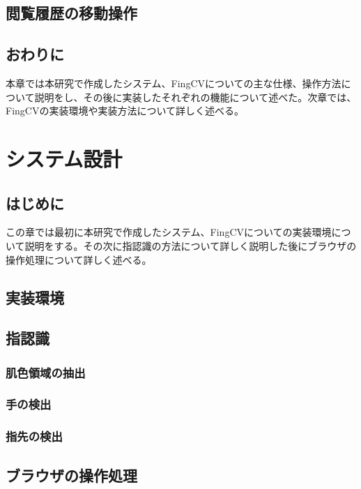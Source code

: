\documentclass[11pt,a4j, titlepage]{jarticle} %
\begin{document}
\subsection{閲覧履歴の移動操作}


\subsection{おわりに}
本章では本研究で作成したシステム、FingCVについての主な仕様、操作方法について説明をし、その後に実装したそれぞれの機能について述べた。次章では、FingCVの実装環境や実装方法について詳しく述べる。

\newpage
\section{システム設計}
\subsection{はじめに}
この章では最初に本研究で作成したシステム、FingCVについての実装環境について説明をする。その次に指認識の方法について詳しく説明した後にブラウザの操作処理について詳しく述べる。

\subsection{実装環境}


\subsection{指認識}


\subsubsection{肌色領域の抽出}


\subsubsection{手の検出}


\subsubsection{指先の検出}


\subsection{ブラウザの操作処理}
\end{document}

